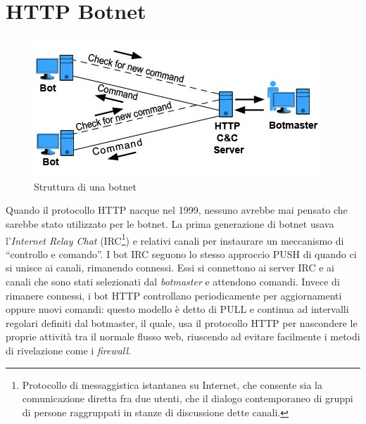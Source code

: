 \vspace*{1cm}
\section{HTTP Botnet}
\begin{figure}[h]
        \centering
		\includegraphics[width=0.5\linewidth]{./imgs/botnet1999}
        \caption{Struttura di una botnet}
        \label{strutturabotnet}
\end{figure}
Quando il protocollo HTTP nacque nel 1999, nessuno avrebbe mai pensato che sarebbe stato utilizzato per le botnet. 
La prima generazione di botnet usava l'\textit{Internet Relay Chat} (IRC\footnote{Protocollo di messaggistica istantanea su Internet, che consente sia la comunicazione diretta fra due utenti, che il dialogo contemporaneo di gruppi di persone raggruppati in stanze di discussione dette canali.}) e relativi canali per instaurare un meccanismo di ``controllo e comando''. I bot IRC seguono lo stesso approccio PUSH di quando ci si unisce ai canali, rimanendo connessi. Essi si connettono ai server IRC e ai canali che sono stati selezionati dal \textit{botmaster} e attendono comandi. 
Invece di rimanere connessi, i bot HTTP controllano periodicamente per aggiornamenti oppure nuovi comandi: questo modello \`e detto di PULL e continua ad intervalli regolari definiti dal botmaster, il quale, usa il protocollo HTTP per nascondere le proprie attivit\`{a} tra il normale flusso web, riuscendo ad evitare facilmente i metodi di rivelazione come i \textit{firewall}. 

\vspace*{1cm}
